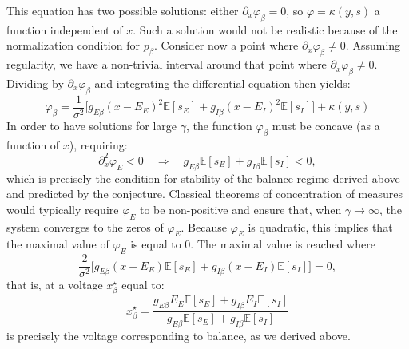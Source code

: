 \documentclass[onefignum,onetabnum]{siamart190516}
\newcommand{\R}{\mathbb{R}}
\newcommand{\1}{\mathbbm{1}}
\newcommand{\eps}{\varepsilon}
\newcommand{\review}[1]{\textcolor{midblue}{ #1}}
\renewcommand{\review}[1]{{ #1}}
\begin{document}
\review{This equation has two possible solutions: either $\partial_x \varphi_\beta=0$, so $\varphi=\kappa(y,s)$ a function independent of $x$. Such a solution would not be realistic because of the normalization condition for $p_\beta$. Consider now a point where $\partial_x \varphi_\beta\neq 0$. Assuming regularity, we have a non-trivial interval around that point where $\partial_x \varphi_\beta\neq 0$. Dividing by $\partial_x \varphi_\beta$ and integrating the differential equation then yields:}
\[
\varphi_\beta =\frac{1}{\sigma^2}\Big[g_{E\beta} (x-E_E)^2 \mathbb{E}[  s_E]+g_{I\beta} (x-E_I)^2\mathbb{E}[  s_I]\Big]+\kappa(y,s)
\]
In order to have solutions for large $\gamma$, the function $\varphi_\beta$ must be concave (as a function of $x$), requiring:
\[
\partial^2_x\varphi_E<0\quad\Rightarrow\quad g_{E\beta}  \mathbb{E}[s_E]+g_{I\beta}  \mathbb{E}[s_I]<0,
\]
which is precisely the condition for stability of the balance regime derived above and predicted by the conjecture. Classical theorems of concentration of measures would typically require $\varphi_E$ to be non-positive and ensure that, when $\gamma \to \infty$, the system converges to the zeros of $\varphi_E$. Because $\varphi_E$ is quadratic, this implies that the maximal value of $\varphi_E$ is equal to $0$. The maximal value is reached where
\[
\frac{2}{\sigma^2}\Big[g_{E\beta} (x-E_E)  \mathbb{E}[s_E]+g_{I\beta} (x-E_I) \mathbb{E}[s_I]\Big]=0, \]
that is, at a voltage $x^\star_\beta$ equal to:
\[x^\star_\beta= \frac{g_{E\beta} E_E  \mathbb{E}[s_E]+g_{I\beta}E_I  \mathbb{E}[s_I]}{g_{E\beta}  \mathbb{E}[s_E]+g_{I\beta}  \mathbb{E}[s_I]}
\]
is precisely the voltage corresponding to balance, as we derived above. 


\end{document}
